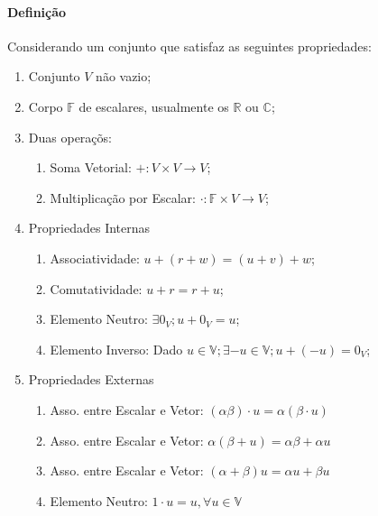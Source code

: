 \documentclass{article}
\begin{document}
        \paragraph{Definição}Considerando um conjunto que satisfaz as seguintes propriedades:
            \begin{enumerate}[noitemsep]
                \item Conjunto $V$ não vazio;
                \item Corpo $\mathbb{F}$ de escalares, usualmente os $\mathbb{R}$ ou $\mathbb{C}$;
                \item Duas operaçõs:
                    \begin{enumerate}[noitemsep]
                        \item Soma Vetorial: $+: V\times V \rightarrow V$;
                        \item Multiplicação por Escalar: $\cdot: \mathbb{F}\times V \rightarrow V$;
                    \end{enumerate}
                \item Propriedades Internas
                    \begin{enumerate}[noitemsep]
                        \item Associatividade: $u+(r+w)=(u+v)+w$;
                        \item Comutatividade: $u+r=r+u$;
                        \item Elemento Neutro: $\exists 0_{V}; u+0_{V}=u$;
                        \item Elemento Inverso: Dado $u\in\mathbb{V}; \exists -u\in\mathbb{V}; u+(-u)=0_{V}$;
                    \end{enumerate}
                \item Propriedades Externas
                    \begin{enumerate}[noitemsep]
                        \item Asso. entre Escalar e Vetor: $(\alpha \beta)\cdot u = \alpha(\beta\cdot u)$
                        \item Asso. entre Escalar e Vetor: $\alpha(\beta + u) = \alpha\beta + \alpha u$
                        \item Asso. entre Escalar e Vetor: $(\alpha+\beta)u = \alpha u + \beta u$
                        \item Elemento Neutro: $1\cdot u = u, \forall u \in \mathbb{V}$
                    \end{enumerate}
            \end{enumerate}
        
\end{document}
